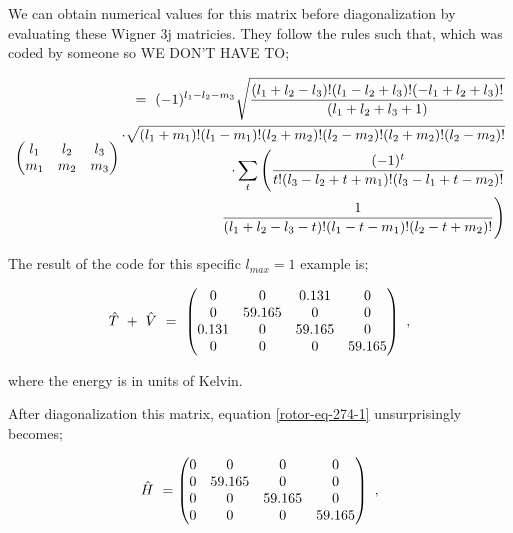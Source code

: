 \documentclass{article}
\begin{document}
We can obtain numerical values for this matrix before diagonalization by evaluating these Wigner 3j matricies. They follow the rules such that, which was coded by someone so WE DON'T HAVE TO; 

\begin{equation} \label{rotor-eq-273-1}
\begin{pmatrix} l_1 & l_2 & l_3 \\ m_1 & m_2 & m_3 \end{pmatrix}
\begin{aligned}
= \hspace{0.125cm} (-1)^{l_1 - l_2 - m_3} \sqrt{\frac{(l_1 + l_2 - l_3)!(l_1 - l_2 + l_3)!(-l_1 + l_2 + l_3)!}{(l_1 + l_2 + l_3 + 1)}}  \\ \cdot \sqrt{(l_1 + m_1)!(l_1 - m_1)!(l_2 + m_2)!(l_2 - m_2)!(l_2 + m_2)!(l_2 - m_2)!} \\  \cdot \sum_{t} \Bigg( \frac{(-1)^{t}}{t!(l_3 - l_2 + t + m_1)!(l_3 - l_1 + t - m_2)!} \\ \frac{1}{
(l_1 + l_2 - l_3 - t)!(l_1 - t - m_1)!(l_2 - t + m_2)!} \Bigg)
\end{aligned}
\end{equation}

The result of the code for this specific \begin{math} l_{max} = 1 \end{math} example is;

\begin{equation} \label{rotor-eq-274-1}
\hat{T} \hspace{0.125cm}  + \hspace{0.125cm} \hat{V} \hspace{0.125cm} = \hspace{0.125cm} \begin{pmatrix} 0 & 0 & 0.131 & 0 \\ 0 & 59.165 & 0 & 0 \\ 0.131 & 0 & 59.165 & 0 \\ 0 & 0 & 0 & 59.165 \end{pmatrix} \hspace{0.125cm} ,
\end{equation} 

where the energy is in units of Kelvin.

After diagonalization this matrix, equation \ref{rotor-eq-274-1} unsurprisingly becomes;

\begin{equation} \label{rotor-eq-275-1}
\hat{H} \hspace{0.125cm} = \begin{pmatrix} 0 & 0 & 0 & 0 \\ 0 & 59.165 & 0 & 0 \\ 0 & 0 & 59.165 & 0 \\ 0 & 0 & 0 & 59.165 \end{pmatrix} \hspace{0.125cm} ,
\end{equation} 
\end{document}
